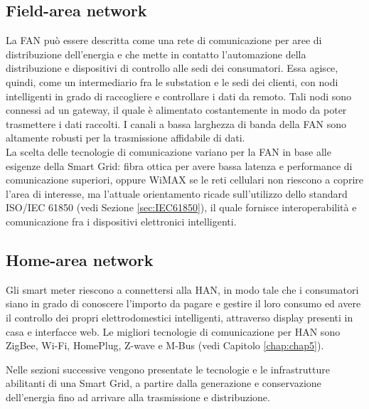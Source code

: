 \subsection{Field-area network}
La FAN può essere descritta come una rete di comunicazione per aree di distribuzione dell'energia e che mette in contatto l'automazione della distribuzione e dispositivi di controllo alle sedi dei consumatori. Essa agisce, quindi, come un intermediario fra le substation e le sedi dei clienti, con nodi intelligenti in grado di raccogliere e controllare i dati da remoto. Tali nodi sono connessi ad un gateway, il quale è alimentato costantemente in modo da poter trasmettere i dati raccolti. I canali a bassa larghezza di banda della FAN sono altamente robusti per la trasmissione affidabile di dati. 
\\ 
La scelta delle tecnologie di comunicazione  variano per la FAN in base alle esigenze della Smart Grid: fibra ottica per avere bassa latenza e performance di comunicazione superiori, oppure WiMAX se le reti cellulari non riescono a coprire l'area di interesse, ma l'attuale orientamento ricade sull'utilizzo dello standard ISO/IEC 61850 (vedi Sezione \ref{sec:IEC61850}), il quale fornisce interoperabilità e comunicazione fra i dispositivi elettronici intelligenti.

\subsection{Home-area network}{
Gli smart meter riescono a connettersi alla HAN, in modo tale che i consumatori siano in grado di conoscere l'importo da pagare e gestire il loro consumo ed avere il controllo dei propri elettrodomestici intelligenti, attraverso display presenti in casa e interfacce web. Le migliori tecnologie di comunicazione per HAN sono ZigBee, Wi-Fi, HomePlug, Z-wave e M-Bus (vedi Capitolo \ref{chap:chap5}).
}

\vspace{20pt}\hspace{-17pt}Nelle sezioni successive vengono presentate le tecnologie e le infrastrutture abilitanti di una Smart Grid, a partire dalla generazione e conservazione dell'energia fino ad arrivare alla trasmissione e distribuzione.

